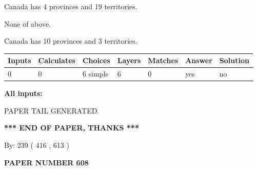 \documentclass[12pt]{article}
\begin{document}
 
Canada has   4 provinces and  19 territories.
 
 
 None of above.
 
 
\noindent{}
 
 
Canada has 10  provinces and 3 territories.
 
 
\noindent{}
 
 
   
   
   
   
\noindent\begin{tabular}{|l|l|l|l|l|l|l|}
 \hline
Inputs & Calculates & Choices & Layers & Matches & Answer & Solution \\ \hline
 0  & 
 0  & 
 6
  simple  
  & 
 6  & 
 0  & 
  yes & 
  no 
  \\ \hline
 \end{tabular}
   
   
   
   
\noindent{}
   
   
   
   
\noindent\vspace{0.1in}\hspace{-0.08in} {\textbf{\Large{All inputs: }}}
   
   
   
   
   
   
 \vspace{0.2in}
 
   
   
\vspace{2.0in} PAPER TAIL GENERATED.
   
   
   
   
\vspace{1.0in} 
{\textbf{\large{ *** END OF PAPER, THANKS *** }}} 
   
   
\hspace{1.0in} By: 
 239 ( 416 ,  613 )
   
   
   
   
\newpage 
\setcounter{page}{ 
   608001 } 
   
   
   
   
 {\textbf{ \Large{ PAPER NUMBER  608  }}}
   
\end{document}
